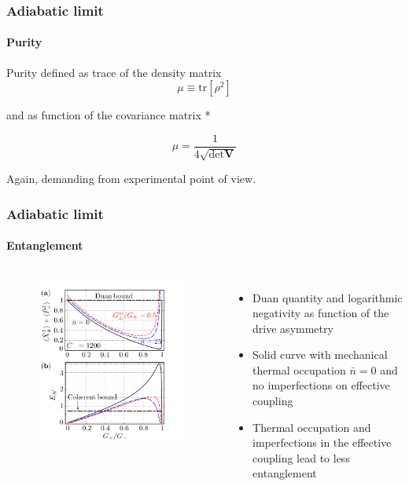 \documentclass[aspectratio=43]{beamer}
\begin{document}
\begin{frame}
	
	\frametitle{Adiabatic limit}
	\framesubtitle{Purity}
	
	Purity defined as trace of the density matrix
	\begin{equation}
		\mu \equiv \textrm{tr}[\rho^{2}] \nonumber
	\end{equation}	
		
	and as function of the covariance matrix {\color{blue}*}
	
	\begin{equation}
		\mu = \frac{1}{4 \sqrt{\det \textbf{V}}} \nonumber
	\end{equation}
	
	\vspace{0.5 cm}
	
	Again, demanding from experimental point of view.
	
\end{frame}

\begin{frame}
	
	\frametitle{Adiabatic limit}
	\framesubtitle{Entanglement}
	
	\begin{columns}
		
		
		\begin{figure}
			\includegraphics[width = 6 cm]{plots/plot_entanglement.png}
		\end{figure}	
	
		
		\begin{itemize}
			\item Duan quantity and logarithmic negativity as function of the drive asymmetry
			\item Solid curve with mechanical thermal occupation $\bar{n} = 0$ and no imperfections on effective coupling
			\item Thermal occupation and imperfections in the effective coupling lead to less entanglement
		\end{itemize}
		
	\end{columns}

\end{frame}
\end{document}
